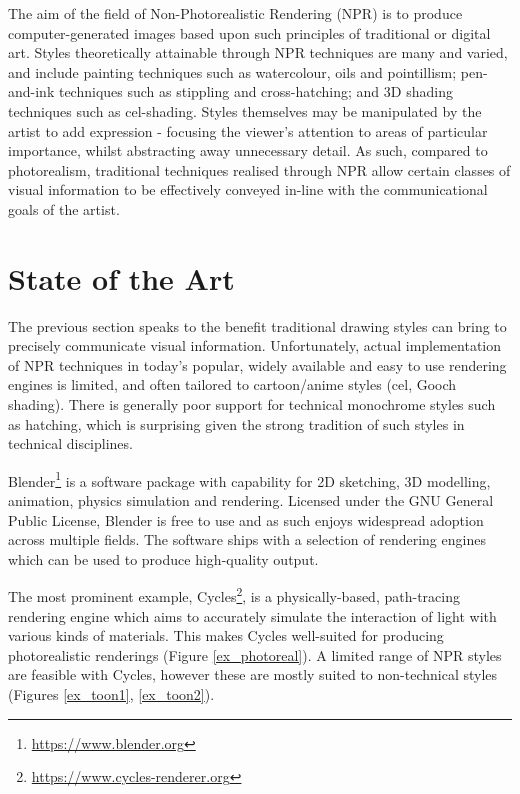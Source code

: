 The aim of the field of Non-Photorealistic Rendering (NPR) is to produce computer-generated images based upon such principles of traditional or digital art.
Styles theoretically attainable through NPR techniques are many and varied, and include painting techniques such as watercolour, oils and pointillism; pen-and-ink techniques such as stippling and cross-hatching; and 3D shading techniques such as cel-shading.
Styles themselves may be manipulated by the artist to add expression - focusing the viewer's attention to areas of particular importance, whilst abstracting away unnecessary detail.
As such, compared to photorealism, traditional techniques realised through NPR allow certain classes of visual information to be effectively conveyed in-line with the communicational goals of the artist.

\section{State of the Art}

The previous section speaks to the benefit traditional drawing styles can bring to precisely communicate visual information. Unfortunately, actual implementation of NPR techniques in today's popular, widely available and easy to use rendering engines is limited, and often tailored to cartoon/anime styles (cel, Gooch shading).
There is generally poor support for technical monochrome styles such as hatching, which is surprising given the strong tradition of such styles in technical disciplines.

Blender\footnote{\url{https://www.blender.org}} is a software package with capability for 2D sketching, 3D modelling, animation, physics simulation and rendering.
Licensed under the GNU General Public License, Blender is free to use and as such enjoys widespread adoption across multiple fields.
The software ships with a selection of rendering engines which can be used to produce high-quality output.

The most prominent example, Cycles\footnote{\url{https://www.cycles-renderer.org}}, is a physically-based, path-tracing rendering engine which aims to accurately simulate the interaction of light with various kinds of materials.
This makes Cycles well-suited for producing photorealistic renderings (Figure \ref{ex_photoreal}).
A limited range of NPR styles are feasible with Cycles, however these are mostly suited to non-technical styles (Figures \ref{ex_toon1}, \ref{ex_toon2}).

